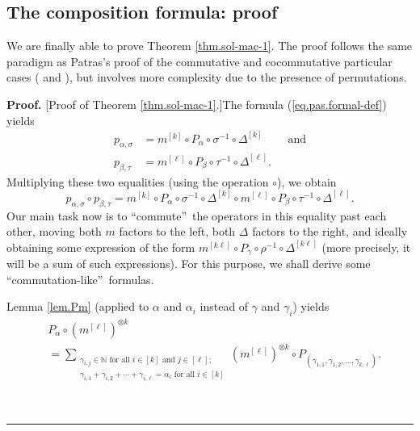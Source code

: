 \documentclass[numbers=enddot,12pt,final,onecolumn,notitlepage]{scrartcl}%
\theoremstyle{definition}
\newenvironment{proof}[1][Proof]{\noindent\textbf{#1.} }{\ \rule{0.5em}{0.5em}}
\let\sumnonlimits\sum
\renewcommand{\sum}{\sumnonlimits\limits}
\begin{document}
\subsection{The composition formula: proof}

We are finally able to prove Theorem \ref{thm.sol-mac-1}. The proof follows
the same paradigm as Patras's proof of the commutative and cocommutative
particular cases (\cite[preuve de Th\'{e}or\`{e}me II,7]{Patras94} and
\cite[proof of Theorem 5.11]{CarPat21}), but involves more complexity due to
the presence of permutations.

\begin{proof}
[Proof of Theorem \ref{thm.sol-mac-1}.]The formula (\ref{eq.pas.formal-def})
yields%
\begin{align}
p_{\alpha,\sigma}  &  =m^{\left[  k\right]  }\circ P_{\alpha}\circ\sigma
^{-1}\circ\Delta^{\left[  k\right]  }\ \ \ \ \ \ \ \ \ \ \text{and}%
\label{pf.thm.sol-mac-1.pas}\\
p_{\beta,\tau}  &  =m^{\left[  \ell\right]  }\circ P_{\beta}\circ\tau
^{-1}\circ\Delta^{\left[  \ell\right]  }. \label{pf.thm.sol-mac-1.pbt}%
\end{align}
Multiplying these two equalities (using the operation $\circ$), we obtain%
\[
p_{\alpha,\sigma}\circ p_{\beta,\tau}=m^{\left[  k\right]  }\circ P_{\alpha
}\circ\sigma^{-1}\circ\Delta^{\left[  k\right]  }\circ m^{\left[  \ell\right]
}\circ P_{\beta}\circ\tau^{-1}\circ\Delta^{\left[  \ell\right]  }.
\]
Our main task now is to \textquotedblleft commute\textquotedblright\ the
operators in this equality past each other, moving both $m$ factors to the
left, both $\Delta$ factors to the right, and ideally obtaining some
expression of the form $m^{\left[  k\ell\right]  }\circ P_{\gamma}\circ
\rho^{-1}\circ\Delta^{\left[  k\ell\right]  }$ (more precisely, it will be a
sum of such expressions). For this purpose, we shall derive some
\textquotedblleft commutation-like\textquotedblright\ formulas.

Lemma \ref{lem.Pm} (applied to $\alpha$ and $\alpha_{i}$ instead of $\gamma$
and $\gamma_{i}$) yields%
\begin{align}
&  P_{\alpha}\circ\left(  m^{\left[  \ell\right]  }\right)  ^{\otimes
k}\nonumber\\
&  =\sum_{\substack{\gamma_{i,j}\in\mathbb{N}\text{ for all }i\in\left[
k\right]  \text{ and }j\in\left[  \ell\right]  ;\\\gamma_{i,1}+\gamma
_{i,2}+\cdots+\gamma_{i,\ell}=\alpha_{i}\text{ for all }i\in\left[  k\right]
}}\left(  m^{\left[  \ell\right]  }\right)  ^{\otimes k}\circ P_{\left(
\gamma_{1,1},\gamma_{1,2},\ldots,\gamma_{k,\ell}\right)  }.
\label{pf.thm.sol-mac-1.Pm1}%
\end{align}



\end{proof}
\end{document}

